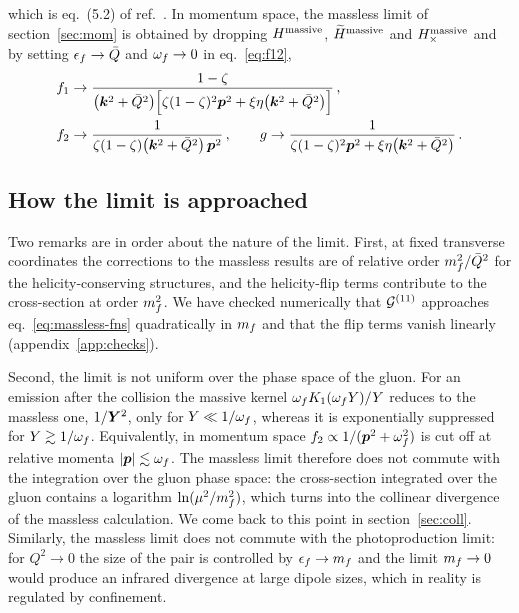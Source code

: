 which is eq.~(5.2) of ref.~\cite{Iancu:2022gpw}. In momentum space, the massless limit of
section~\ref{sec:mom} is obtained by dropping $H^{\rm massive}$, $\widetilde H^{\rm massive}$ and
$H_\times^{\rm massive}$ and by setting $\epsilon_f\to\bar Q$ and $\omega_f\to0$ in eq.~\eqref{eq:f12},
\begin{align}
f_1&\to\frac{1-\zeta}{\big(\bm{k}^2+\bar Q^2\big)\Big[\zeta(1-\zeta)^2\bm{p}^2+\xi\eta\big(\bm{k}^2+\bar Q^2\big)\Big]}\,,
\nonumber\\
f_2&\to\frac{1}{\zeta(1-\zeta)\big(\bm{k}^2+\bar Q^2\big)\,\bm{p}^2}\,,\qquad
g\to\frac{1}{\zeta(1-\zeta)^2\bm{p}^2+\xi\eta\big(\bm{k}^2+\bar Q^2\big)}\,.
\label{eq:f-massless}
\end{align}

\subsection{How the limit is approached}

Two remarks are in order about the nature of the limit. First, at fixed transverse coordinates the
corrections to the massless results are of relative order $m_f^2/\bar Q^2$ for the helicity-conserving
structures, and the helicity-flip terms contribute to the cross-section at order $m_f^2$. We have
checked numerically that $\mathcal{G}^{(11)}$ approaches eq.~\eqref{eq:massless-fns} quadratically in $m_f$ and
that the flip terms vanish linearly (appendix~\ref{app:checks}).

Second, the limit is not uniform over the phase space of the gluon. For an emission after the
collision the massive kernel $\omega_f K_1(\omega_f Y)/Y$ reduces to the massless one, $1/\bm{Y}^2$, only for
$Y\ll1/\omega_f$, whereas it is exponentially suppressed for $Y\gtrsim1/\omega_f$. Equivalently, in momentum
space $f_2\propto1/(\bm{p}^2+\omega_f^2)$ is cut off at relative momenta $|\bm{p}|\lesssim\omega_f$. The massless limit
therefore does not commute with the integration over the gluon phase space: the cross-section
integrated over the gluon contains a logarithm $\ln(\mu^2/m_f^2)$, which turns into the collinear
divergence of the massless calculation. We come back to this point in section~\ref{sec:coll}.
Similarly, the massless limit does not commute with the photoproduction limit: for $Q^2\to0$ the size
of the pair is controlled by $\epsilon_f\to m_f$ and the limit $m_f\to0$ would produce an infrared divergence
at large dipole sizes, which in reality is regulated by confinement.

